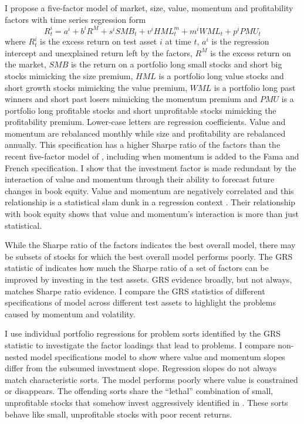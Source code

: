 I propose a five-factor model of market, size, value, momentum and
profitability factors with time series regression form
\begin{equation} \label{eq:B16}
R_t^i = a^i+b^iR^M+s^iSMB_t+v^iHML_t^m+m^iWML_t+p^iPMU_t 
\end{equation}
where $R_t^i$ is the excess return on test asset $i$ at time $t$,
$a^i$ is the regression intercept and unexplained return left by the factors,
$R^M$ is the excess return on the market,
$SMB$ is the return on a portfolio long small stocks and short big stocks
mimicking the size premium,
$HML$ is a portfolio long value stocks and short growth stocks mimicking the
value premium,
$WML$ is a portfolio long past winners and short past losers mimicking the
momentum premium and
$PMU$ is a portfolio long profitable stocks and short unprofitable stocks
mimicking the profitability premium.
Lower-case letters are regression coefficients.
Value and momentum are rebalanced monthly while size and profitability are
rebalanced annually.
This specification has a higher Sharpe ratio of the factors
than the recent five-factor model of \textcite{fama2015five}, including when
momentum is added to the Fama and French specification.
I show that the investment factor is made redundant by
the interaction of value and momentum through their ability to forecast
future changes in book equity.
Value and momentum are negatively correlated and this relationship is a
statistical slam dunk in a regression context 
\parencite{asness1997interaction, fama2015incremental}.
Their relationship with book equity shows that value and
momentum's interaction is more than just statistical.

While the Sharpe ratio of the factors indicates the best overall model,
there may be subsets of stocks for which the best overall model
performs poorly.
The GRS statistic of \textcite{gibbons1989test} indicates how much the Sharpe
ratio of a set of factors can be improved by investing in the test assets.
GRS evidence broadly, but not always, matches Sharpe ratio evidence.
I compare the GRS statistics of different specifications of model across
different test assets to highlight the problems caused by momentum and
volatility.

I use individual portfolio regressions for problem sorts identified by the GRS
statistic to investigate the factor loadings that lead to problems. I compare
non-nested model specifications model to show where value and momentum slopes
differ from the subsumed investment slope. Regression slopes do not always
match characteristic sorts. The model performs poorly where value is
constrained or disappears. The offending sorts share the ``lethal”
combination of small, unprofitable stocks that somehow invest aggressively
identified in \textcite{fama2015five, fama2016dissecting}. These sorts behave
like small, unprofitable stocks with poor recent returns.
